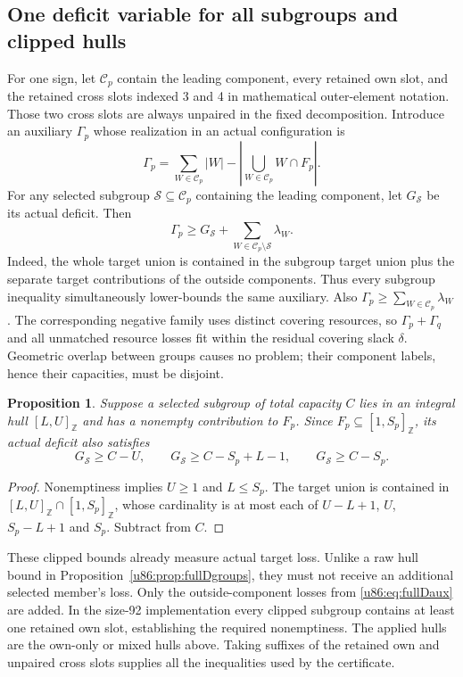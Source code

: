 \documentclass[11pt,a4paper]{article}
\newtheorem{proposition}[theorem]{Proposition}
\theoremstyle{remark}
\newcommand{\Z}{\mathbb Z}
\begin{document}
\subsection{One deficit variable for all subgroups and clipped hulls}
For one sign, let $\mathcal C_p$ contain the leading component, every
retained own slot, and the retained cross slots indexed 3 and 4 in
mathematical outer-element notation. Those two cross slots are always
unpaired in the fixed decomposition. Introduce an auxiliary $\Gamma_p$
whose realization in an actual configuration is
\[
 \Gamma_p=\sum_{W\in\mathcal C_p}|W|
                 -\left|\bigcup_{W\in\mathcal C_p}W\cap F_p\right|.
\]
For any selected subgroup $\mathcal S\subseteq\mathcal C_p$ containing
the leading component, let $G_{\mathcal S}$ be its actual deficit.
Then
\begin{equation}\label{u86:eq:fullDaux}
 \Gamma_p\ge G_{\mathcal S}+
       \sum_{W\in\mathcal C_p\setminus\mathcal S}\lambda_W.
\end{equation}
Indeed, the whole target union is contained in the subgroup target union
plus the separate target contributions of the outside components.
Thus every subgroup inequality simultaneously lower-bounds the same
auxiliary. Also $\Gamma_p\ge\sum_{W\in\mathcal C_p}\lambda_W$.
The corresponding negative family uses distinct covering resources, so
$\Gamma_p+\Gamma_q$ and all unmatched resource losses fit within the
residual covering slack $\delta$. Geometric overlap between groups
causes no problem; their component labels, hence their capacities,
must be disjoint.

\begin{proposition}\label{u86:prop:clippedfullD}
Suppose a selected subgroup of total capacity $C$ lies in an integral
hull $[L,U]_{\Z}$ and has a nonempty contribution to $F_p$.
Since $F_p\subseteq[1,S_p]_{\Z}$, its actual deficit also satisfies
\[
 G_{\mathcal S}\ge C-U,\qquad
 G_{\mathcal S}\ge C-S_p+L-1,\qquad
 G_{\mathcal S}\ge C-S_p.
\]
\end{proposition}
\begin{proof}
Nonemptiness implies $U\ge1$ and $L\le S_p$. The target union is contained
in $[L,U]_{\Z}\cap[1,S_p]_{\Z}$, whose cardinality is at most each of
$U-L+1$, $U$, $S_p-L+1$ and $S_p$. Subtract from $C$.
\end{proof}
These clipped bounds already measure actual target loss. Unlike a raw
hull bound in Proposition~\ref{u86:prop:fullDgroups}, they must not receive
an additional selected member's loss. Only the outside-component losses
from \eqref{u86:eq:fullDaux} are added. In the size-92 implementation every
clipped subgroup contains at least one retained own slot, establishing
the required nonemptiness. The applied hulls are the own-only or mixed
hulls above. Taking suffixes of the retained own and unpaired cross
slots supplies all the inequalities used by the certificate.
\end{document}
